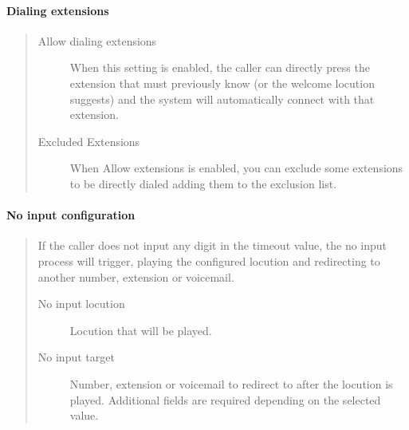 \documentclass[letterpaper,10pt,spanish]{sphinxmanual}
\begin{document}
\paragraph{Dialing extensions}
\label{administration_portal/client/vpbx/routing_endpoints/ivrs:dialing-extensions}\begin{quote}
\begin{description}
\item[{Allow dialing extensions}] \leavevmode
When this setting is enabled, the caller can directly press the extension
that must previously know (or the welcome locution suggests) and the system
will automatically connect with that extension.

\item[{Excluded Extensions}] \leavevmode
When Allow extensions is enabled, you can exclude some extensions to be
directly dialed adding them to the exclusion list.

\end{description}
\end{quote}


\paragraph{No input configuration}
\label{administration_portal/client/vpbx/routing_endpoints/ivrs:no-input-configuration}\begin{quote}

If the caller does not input any digit in the timeout value, the
no input process will trigger, playing the configured locution and
redirecting to another number, extension or voicemail.
\begin{description}
\item[{No input locution}] \leavevmode
Locution that will be played.

\item[{No input target}] \leavevmode
Number, extension or voicemail to redirect to after the locution is played.
Additional fields are required depending on the selected value.

\end{description}
\end{quote}
\end{document}
